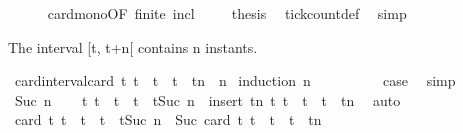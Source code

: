 \begin{isabellebody}
\ \ \ \ \isamarkupfalse%
\ card{\isacharunderscore}mono{\isacharbrackleft}OF\ finite\ incl{\isacharbrackright}\ \isacommand{{\isachardot}}\isamarkupfalse%
\isanewline
\ \ \isamarkupfalse%
\ {\isacharquery}thesis\ \isamarkupfalse%
\ tick{\isacharunderscore}count{\isacharunderscore}def\ \isamarkupfalse%
\ simp\isanewline
{}\isamarkupfalse%
%
\endisatagproof
{\isafoldproof}%
%
\isadelimproof
%
\endisadelimproof
%
\begin{isamarkuptext}%
The interval [t, t+n[ contains n instants.%
\end{isamarkuptext}\isamarkuptrue%
\isamarkupfalse%
\ card{\isacharunderscore}interval{\isacharcolon}{\isacartoucheopen}card\ {\isacharbraceleft}t{\isachardot}\ t\ {\isasymle}\ t\ {\isasymand}\ t\ {\isacharless}\ tn{\isacharbraceright}\ {\isacharequal}\ n{\isacartoucheclose}\isanewline
%
\isadelimproof
%
\endisadelimproof
%
\isatagproof
{}\isamarkupfalse%
\ {\isacharparenleft}induction\ n{\isacharparenright}\isanewline
\ \ \isamarkupfalse%
\ {}\isanewline
\ \ \isamarkupfalse%
\ \isamarkupfalse%
\ {\isacharquery}case\ \isamarkupfalse%
\ simp\isanewline
{}\isamarkupfalse%
\isanewline
\ \ \isamarkupfalse%
\ {\isacharparenleft}Suc\ n{\isacharparenright}\isanewline
\ \ \isamarkupfalse%
\ {\isacartoucheopen}{\isacharbraceleft}t{\isachardot}\ t\ {\isasymle}\ t\ {\isasymand}\ t\ {\isacharless}\ tSuc\ n{\isacharparenright}{\isacharbraceright}\ {\isacharequal}\ insert\ {\isacharparenleft}tn{\isacharparenright}\ {\isacharbraceleft}t{\isachardot}\ t\ {\isasymle}\ t\ {\isasymand}\ t\ {\isacharless}\ tn{\isacharbraceright}{\isacartoucheclose}\ \isamarkupfalse%
\ auto\isanewline
\ \ \isamarkupfalse%
\ {\isacartoucheopen}card\ {\isacharbraceleft}t{\isachardot}\ t\ {\isasymle}\ t\ {\isasymand}\ t\ {\isacharless}\ tSuc\ n{\isacharparenright}{\isacharbraceright}\ {\isacharequal}\ Suc\ {\isacharparenleft}card\ {\isacharbraceleft}t{\isachardot}\ t\ {\isasymle}\ t\ {\isasymand}\ t\ {\isacharless}\ tn{\isacharbraceright}{\isacharparenright}{\isacartoucheclose}\ \isamarkupfalse%

\end{isabellebody}
